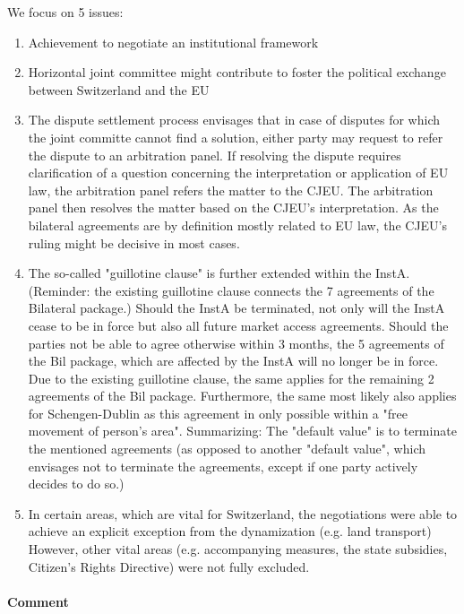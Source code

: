 We focus on 5 issues:
\begin{enumerate}
    \item Achievement to negotiate an institutional framework
    \item Horizontal joint committee might contribute to foster the
        political exchange between Switzerland and the EU
    \item The dispute settlement process envisages that in case of disputes for
        which the joint committe cannot find a solution, either party may request
        to refer the dispute to an arbitration panel. If resolving the dispute
        requires clarification of a question concerning the interpretation or
        application of EU law, the arbitration panel refers the matter to the
        CJEU. The arbitration panel then resolves the matter based on the CJEU's
        interpretation. As the bilateral agreements are by definition mostly
        related to EU law, the CJEU's ruling might be decisive in most cases.
    \item The so-called "guillotine clause" is further extended within the InstA.
        (Reminder: the existing guillotine clause connects the 7 agreements of the
        Bilateral  package.) Should the InstA be terminated, not only
        will the InstA cease to be in force but also all future market access
        agreements. Should the parties not be able to agree otherwise within 3
        months, the 5 agreements of the Bil  package, which are affected
        by the InstA will no longer be in force. Due to the existing guillotine
        clause, the same applies for the remaining 2 agreements of the Bil 
        package. Furthermore, the same most likely also applies for Schengen-Dublin
        as this agreement in only possible within a "free movement of person's area".
        Summarizing: The "default value" is to terminate the mentioned agreements
        (as opposed to another "default value", which envisages not to terminate
        the agreements, except if one party actively decides to do so.)
    \item In certain areas, which are vital for Switzerland, the negotiations
        were able to achieve an explicit exception from the dynamization (e.g.
        land transport) However, other vital areas (e.g. accompanying measures,
        the state subsidies, Citizen's Rights Directive) were not fully excluded.
\end{enumerate}

\paragraph{Comment}

